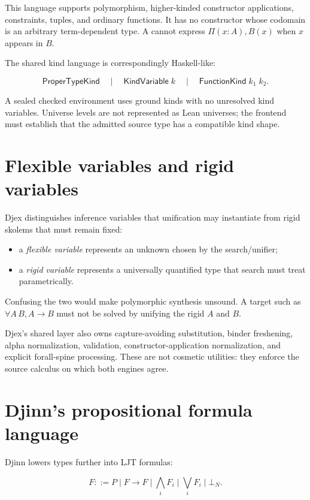 \documentclass[10pt,letterpaper,oneside,openany]{report}
\newcommand{\term}[1]{\texttt{\detokenize{#1}}}
\begin{document}
This language supports polymorphism, higher-kinded constructor applications, constraints, tuples, and ordinary functions.  It has no constructor whose codomain is an arbitrary term-dependent type.  A \term{FunctionType A B} cannot express $\Pi(x:A),B(x)$ when $x$ appears in $B$.

The shared kind language is correspondingly Haskell-like:

\[
\mathsf{ProperTypeKind}
\quad\mid\quad
\mathsf{KindVariable}\;k
\quad\mid\quad
\mathsf{FunctionKind}\;k_1\;k_2.
\]

A sealed checked environment uses ground kinds with no unresolved kind variables.  Universe levels are not represented as Lean universes; the frontend must establish that the admitted source type has a compatible kind shape.

\section{Flexible variables and rigid variables}

Djex distinguishes inference variables that unification may instantiate from rigid skolems that must remain fixed:

\begin{itemize}
\item a \emph{flexible variable} represents an unknown chosen by the search/unifier;
\item a \emph{rigid variable} represents a universally quantified type that search must treat parametrically.
\end{itemize}

Confusing the two would make polymorphic synthesis unsound.  A target such as $\forall A\,B, A\to B$ must not be solved by unifying the rigid $A$ and $B$.

Djex's shared layer also owns capture-avoiding substitution, binder freshening, alpha normalization, validation, constructor-application normalization, and explicit forall-spine processing.  These are not cosmetic utilities: they enforce the source calculus on which both engines agree.

\section{Djinn's propositional formula language}

Djinn lowers types further into LJT formulas:

\[
F ::= P
\mid F \to F
\mid \bigwedge_i F_i
\mid \bigvee_i F_i
\mid \bot_N.
\]
\end{document}
